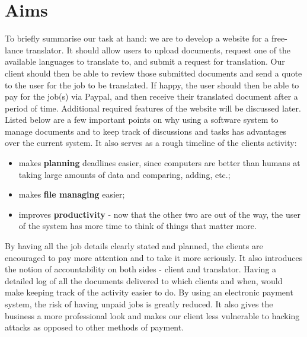 \documentclass{l3proj}
\begin{document}
\section{Aims}
To briefly summarise our task at hand: we are to develop a website for a free-lance translator. It should allow users to upload documents, request one of the available languages to translate to, and submit a request for translation. Our client should then be able to review those submitted documents and send a quote to the user for the job to be translated. If happy, the user should then be able to pay for the job(s) via Paypal, and then receive their translated document after a period of time. Additional required features of the website will be discussed later. Listed below are a few important points on why using a software system to manage documents and to keep track of discussions and tasks has advantages over the current system. It also serves as a rough timeline of the clients activity:

\begin{itemize}
	\item
	makes {\bf planning} deadlines easier, since computers are better than humans
	at taking large amounts of data and comparing, adding, etc.;
	\item
	makes {\bf file managing} easier;
	\item
	improves {\bf productivity} - now that the other two are out of the way, the
	user of the system has more time to think of things that matter more.
\end{itemize}

By having all the job details clearly stated and planned, the clients are encouraged to pay more attention and to take it more seriously. It also introduces the notion of accountability on both sides - client and translator. Having a detailed log of all the documents delivered to which clients and when, would make keeping track of the activity easier to do. By using an electronic payment system, the risk of having unpaid jobs is greatly reduced. It also gives the business a more professional look and makes our client less vulnerable to hacking attacks as opposed to other methods of payment.\\
\end{document}
